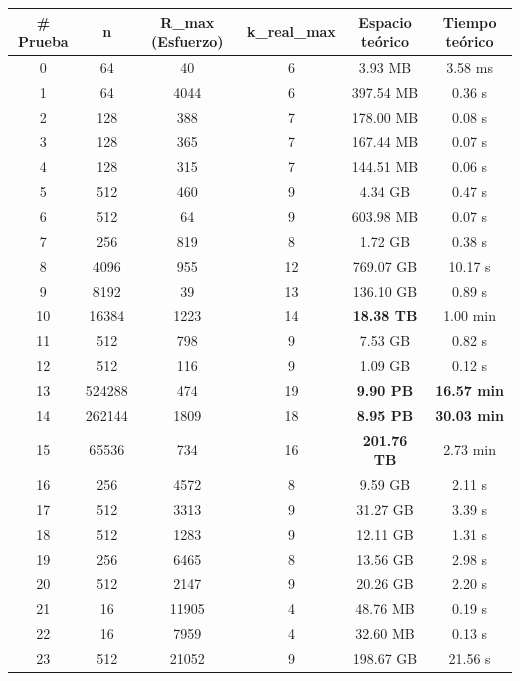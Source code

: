 \documentclass[11pt,letter]{article}
\begin{document}
\begin{table}[H]
    \centering
    \small
    \begin{tabular}{|c|c|c|c|c|c|}
    \hline
    \textbf{\# Prueba} & \textbf{n} & \textbf{R\_max (Esfuerzo)} & \textbf{k\_real\_max} & \textbf{Espacio teórico} & \textbf{Tiempo teórico} \\
    \hline
    0 & 64 & 40 & 6 & 3.93 MB & 3.58 ms \\
    1 & 64 & 4044 & 6 & 397.54 MB & 0.36 s \\
    2 & 128 & 388 & 7 & 178.00 MB & 0.08 s \\
    3 & 128 & 365 & 7 & 167.44 MB & 0.07 s \\
    4 & 128 & 315 & 7 & 144.51 MB & 0.06 s \\
    5 & 512 & 460 & 9 & 4.34 GB & 0.47 s \\
    6 & 512 & 64 & 9 & 603.98 MB & 0.07 s \\
    7 & 256 & 819 & 8 & 1.72 GB & 0.38 s \\
    8 & 4096 & 955 & 12 & 769.07 GB & 10.17 s \\
    9 & 8192 & 39 & 13 & 136.10 GB & 0.89 s \\
    10 & 16384 & 1223 & 14 & \cellcolor{yellow}\textbf{18.38 TB} & 1.00 min \\
    11 & 512 & 798 & 9 & 7.53 GB & 0.82 s \\
    12 & 512 & 116 & 9 & 1.09 GB & 0.12 s \\
    13 & 524288 & 474 & 19 & \cellcolor{yellow}\textbf{9.90 PB} & \cellcolor{yellow}\textbf{16.57 min} \\
    14 & 262144 & 1809 & 18 & \cellcolor{yellow}\textbf{8.95 PB} & \cellcolor{yellow}\textbf{30.03 min} \\
    15 & 65536 & 734 & 16 & \cellcolor{yellow}\textbf{201.76 TB} & 2.73 min \\
    16 & 256 & 4572 & 8 & 9.59 GB & 2.11 s \\
    17 & 512 & 3313 & 9 & 31.27 GB & 3.39 s \\
    18 & 512 & 1283 & 9 & 12.11 GB & 1.31 s \\
    19 & 256 & 6465 & 8 & 13.56 GB & 2.98 s \\
    20 & 512 & 2147 & 9 & 20.26 GB & 2.20 s \\
    21 & 16 & 11905 & 4 & 48.76 MB & 0.19 s \\
    22 & 16 & 7959 & 4 & 32.60 MB & 0.13 s \\
    23 & 512 & 21052 & 9 & 198.67 GB & 21.56 s \\

\end{tabular}
\end{table}
\end{document}
